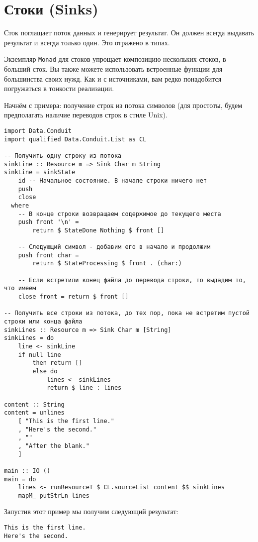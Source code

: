 {\section{Стоки (Sinks)}

Сток поглащает поток данных и генерирует результат. Он должен всегда выдавать результат
и всегда только один. Это отражено в типах.

Экземпляр \lstinline=Monad= для стоков упрощает композицию нескольких стоков, в больший
сток. Вы также
можете использовать встроенные функции для большинства своих нужд. Как и с источниками,
вам редко понадобится погружаться в тонкости реализации. 

Начнём с примера:
получение строк из потока символов (для простоты, будем предполагать наличие переводов
строк в стиле Unix).

\begin{lstlisting}
import Data.Conduit
import qualified Data.Conduit.List as CL

-- Получить одну строку из потока
sinkLine :: Resource m => Sink Char m String
sinkLine = sinkState
    id -- Начальное состояние. В начале строки ничего нет
    push
    close
  where
    -- В конце строки возвращаем содержимое до текущего места
    push front '\n' =
        return $ StateDone Nothing $ front []

    -- Следующий символ - добавим его в начало и продолжим
    push front char =
        return $ StateProcessing $ front . (char:)

    -- Если встретили конец файла до перевода строки, то выдадим то, что имеем
    close front = return $ front []

-- Получить все строки из потока, до тех пор, пока не встретим пустой строки или конца файла
sinkLines :: Resource m => Sink Char m [String]
sinkLines = do
    line <- sinkLine
    if null line
        then return []
        else do
            lines <- sinkLines
            return $ line : lines

content :: String
content = unlines
    [ "This is the first line."
    , "Here's the second."
    , ""
    , "After the blank."
    ]

main :: IO ()
main = do
    lines <- runResourceT $ CL.sourceList content $$ sinkLines
    mapM_ putStrLn lines
\end{lstlisting}
Запустив этот пример мы получим следующий результат:
\begin{verbatim}
This is the first line.
Here's the second.
\end{verbatim}

}
